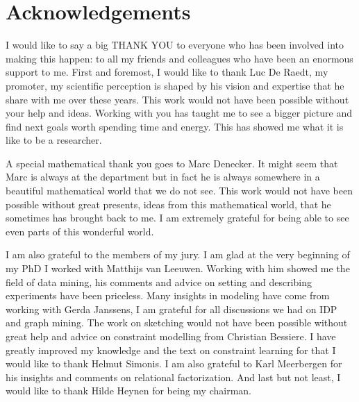 \chapter{Acknowledgements} \label{ch:ack} I would like to say a big THANK YOU to everyone who has been involved into making this happen: to all my friends and colleagues who have been an enormous support to me.  
First and foremost, I would like to thank Luc De Raedt, my promoter, my scientific perception is shaped by his vision and expertise that he share with me over these years. This work would not have been possible without your help and ideas. Working with you has taught me to see a bigger picture and find next goals worth spending time and energy. This has showed me what it is like to be a researcher.

A special mathematical thank you goes to Marc Denecker. It might seem that Marc is always at the department but in fact he is always somewhere in  a beautiful mathematical world that we do not see. This work would not have been possible without great presents, ideas from this mathematical world, that he sometimes has brought back to me. I am extremely grateful for being able to see even parts of this wonderful world.

I am also grateful to the members of my jury. I am glad at the very beginning of my PhD I worked with Matthijs van Leeuwen. Working with him showed me the field of data mining, his comments and advice on setting and describing experiments have been priceless. Many insights in modeling have come from working with Gerda Janssens, I am grateful for all discussions we had on IDP and graph mining. The work on sketching would not have been possible without great help and advice on constraint modelling from Christian Bessiere. I have greatly improved my knowledge and the text on constraint learning for that I would like to thank Helmut Simonis. I am also grateful to Karl Meerbergen for his insights and comments on relational factorization. And last but not least, I would like to thank Hilde Heynen for being my chairman.

